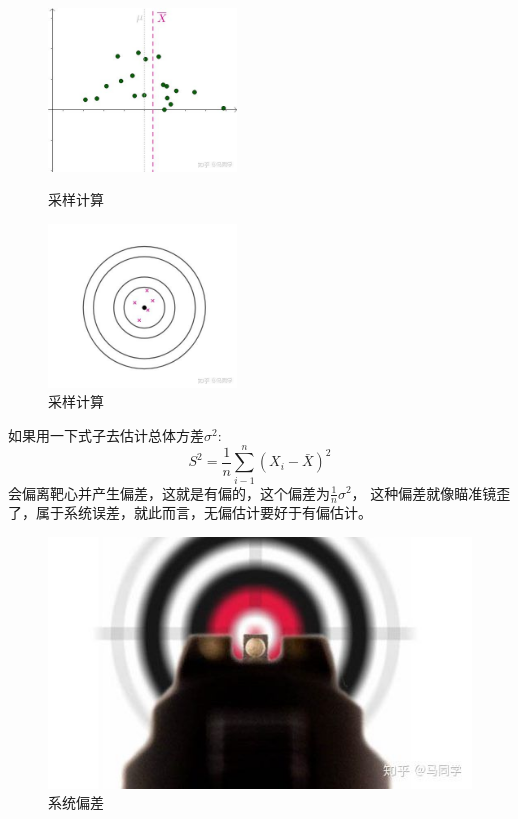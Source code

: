 \documentclass{article}
\begin{document}
\begin{figure}
    \begin{minipage}[t]{5cm}
        \centering
        \includegraphics[width=5cm]{figure2.jpg}
        \caption{采样计算}
    \end{minipage}
    \begin{minipage}[t]{5cm}
        \centering
        \includegraphics[width=5cm]{figure3.jpg}
        \caption{采样计算}
    \end{minipage}
\end{figure}


如果用一下式子去估计总体方差$\sigma^2$:
\begin{equation}
    S^2=\frac{1}{n}\sum\limits_{i-1}^n{(X_i-\bar{X})^2}
\end{equation}
会偏离靶心并产生偏差，这就是有偏的，这个偏差为$\frac{1}{n}\sigma^2$，
这种偏差就像瞄准镜歪了，属于系统误差，就此而言，无偏估计要好于有偏估计。
\begin{figure}
    \centering
    \includegraphics[width=15cm]{figure4.jpg}
    \caption{系统偏差}
\end{figure}
\end{document}
